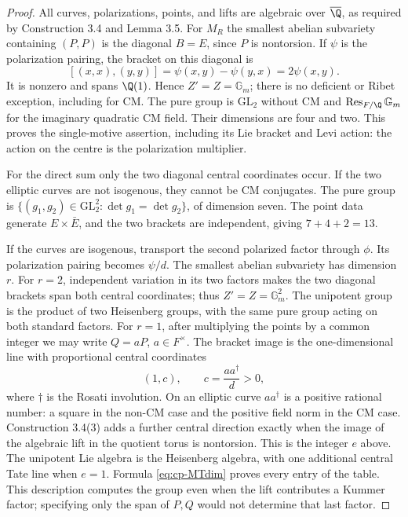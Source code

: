 \begin{proof}
All curves, polarizations, points, and lifts are algebraic over
$\overline\Q$, as required by Construction 3.4 and Lemma 3.5.
For $M_R$ the smallest abelian subvariety containing $(P,P)$ is
the diagonal $B=E$, since $P$ is nontorsion. If $\psi$ is the
polarization pairing, the bracket on this diagonal is
\[
 [(x,x),(y,y)]=\psi(x,y)-\psi(y,x)=2\psi(x,y).
\]
It is nonzero and spans $\Q(1)$. Hence $Z'=Z=\mathbb G_m$;
there is no deficient or Ribet exception, including for CM.
The pure group is $\mathrm{GL}_2$ without CM and
$\operatorname{Res}_{F/\Q}\mathbb G_m$ for the imaginary
quadratic CM field. Their dimensions are four and two.
This proves the single-motive assertion, including its Lie
bracket and Levi action: the action on the centre is the
polarization multiplier.

For the direct sum only the two diagonal central coordinates
occur. If the two elliptic curves are not isogenous, they
cannot be CM conjugates. The pure group is
$\{(g_1,g_2)\in\mathrm{GL}_2^2:\det g_1=\det g_2\}$,
of dimension seven. The point data generate $E\times\bar E$,
and the two brackets are independent, giving $7+4+2=13$.

If the curves are isogenous, transport the second polarized
factor through $\phi$. Its polarization pairing becomes
$\psi/d$. The smallest abelian subvariety has dimension $r$.
For $r=2$, independent variation in its two factors makes the
two diagonal brackets span both central coordinates; thus
$Z'=Z=\mathbb G_m^2$. The unipotent group is the product
of two Heisenberg groups, with the same pure group acting
on both standard factors.
For $r=1$, after multiplying the points by a common integer
we may write $Q=aP$, $a\in F^\times$. The bracket image is
the one-dimensional line with proportional central coordinates
\begin{equation}\label{eq:cp-positive-centre}
 (1,c),\qquad c=\frac{a a^\dagger}{d}>0,
\end{equation}
where $\dagger$ is the Rosati involution. On an elliptic curve
$aa^\dagger$ is a positive rational number: a square in the
non-CM case and the positive field norm in the CM case.
Construction 3.4(3) adds a further central direction exactly
when the image of the algebraic lift in the quotient torus
is nontorsion. This is the integer $e$ above.
The unipotent Lie algebra is the Heisenberg algebra, with one
additional central Tate line when $e=1$. Formula
\eqref{eq:cp-MTdim} proves every entry of the table. This
description computes the group even when the lift contributes
a Kummer factor; specifying only the span of $P,Q$ would
not determine that last factor.
\end{proof}

